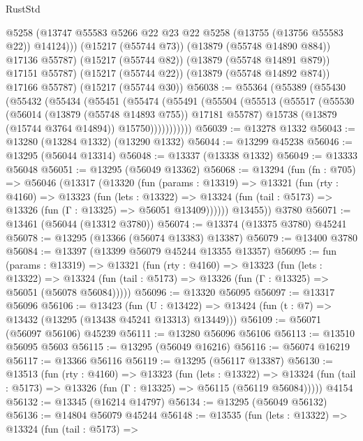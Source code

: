 \begin{lexlean}{RustStd}
\begin{coremodule}
              @5258
              (@13747 @55583 @5266 @22 @23 @22 @5258 (@13755 (@13756 @55583 @22)) @14124)))
          (@15217 (@55744 @73))
          (@13879 (@55748 @14890 @884))
          @17136
          @55787)
        (@15217 (@55744 @82))
        (@13879 (@55748 @14891 @879))
        @17151
        @55787)
      (@15217 (@55744 @22))
      (@13879 (@55748 @14892 @874))
      @17166
      @55787)
    (@15217 (@55744 @30))
@56038 := @55364
    (@55389
      (@55430
        (@55432
          (@55434
            (@55451
              (@55474
                (@55491
                  (@55504
                    (@55513
                      (@55517
                        (@55530
                          (@56014 (@13879 (@55748 @14893 @755)) @17181 @55787)
                          @15738
                          (@13879 (@15744 @3764 @14894))
                          @15750)))))))))))
@56039 := @13278 @1332
@56043 := @13280 (@13284 @1332) (@13290 @1332)
@56044 := @13299 @45238
@56046 := @13295 (@56044 @13314)
@56048 := @13337 (@13338 @1332)
@56049 := @13333 @56048
@56051 := @13295 (@56049 @13362)
@56068 := @13294
    (fun (fn : @705) =>
    @56046
      (@13317
        (@13320
          (fun (params : @13319) =>
          @13321
            (fun (rty : @4160) =>
            @13323
              (fun (lets : @13322) =>
              @13324 (fun (tail : @5173) => @13326 (fun (Γ : @13325) => @56051 @13409))))))
        @13455))
    @3780
@56071 := @13461 (@56044 (@13312 @3780))
@56074 := @13374 (@13375 @3780) @45241
@56078 := @13295 (@13366 (@56074 @13383) @13387)
@56079 := @13400 @3780
@56084 := @13397 (@13399 @56079 @45244 @13355 @13357)
@56095 := fun (params : @13319) =>
  @13321
    (fun (rty : @4160) =>
    @13323
      (fun (lets : @13322) =>
      @13324 (fun (tail : @5173) => @13326 (fun (Γ : @13325) => @56051 (@56078 @56084)))))
@56096 := @13320 @56095
@56097 := @13317 @56096
@56106 := @13423
    (fun (U : @13422) => @13424 (fun (t : @7) => @13432 (@13295 (@13438 @45241 @13313) @13449)))
@56109 := @56071 (@56097 @56106) @45239
@56111 := @13280 @56096 @56106
@56113 := @13510 @56095 @5603
@56115 := @13295 (@56049 @16216)
@56116 := @56074 @16219
@56117 := @13366 @56116
@56119 := @13295 (@56117 @13387)
@56130 := @13513
    (fun (rty : @4160) =>
    @13323
      (fun (lets : @13322) =>
      @13324 (fun (tail : @5173) => @13326 (fun (Γ : @13325) => @56115 (@56119 @56084)))))
    @4154
@56132 := @13345 (@16214 @14797)
@56134 := @13295 (@56049 @56132)
@56136 := @14804 @56079 @45244
@56148 := @13535
    (fun (lets : @13322) =>
    @13324
      (fun (tail : @5173) =>

\end{coremodule}
\end{lexlean}
